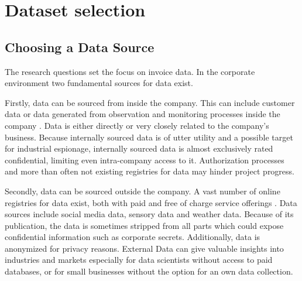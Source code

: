\chapter{Dataset selection}

	\section{Choosing a Data Source}
	\label{data-source}
	
	The research questions set the focus on invoice data. In the corporate environment two fundamental sources for data exist. 
	
	Firstly, data can be sourced from inside the company. This can include customer data or data generated from observation and monitoring processes inside the company \cite{internalExternalData}. Data is either directly or very closely related to the company's business. Because internally sourced data is of utter utility and a possible target for industrial espionage, internally sourced data is almost exclusively rated confidential, limiting even intra-company access to it. Authorization processes and more than often not existing registries for data may hinder project progress.
	
	Secondly, data can be sourced outside the company. A vast number of online registries for data exist, both with paid and free of charge service offerings \cite{whyExternalData}. Data sources include social media data, sensory data and weather data. Because of its publication, the data is sometimes stripped from all parts which could expose confidential information such as corporate secrets. Additionally, data is anonymized for privacy reasons. External Data can give valuable insights into industries and markets especially for data scientists without access to paid databases, or for small businesses without the option for an own data collection.
	
